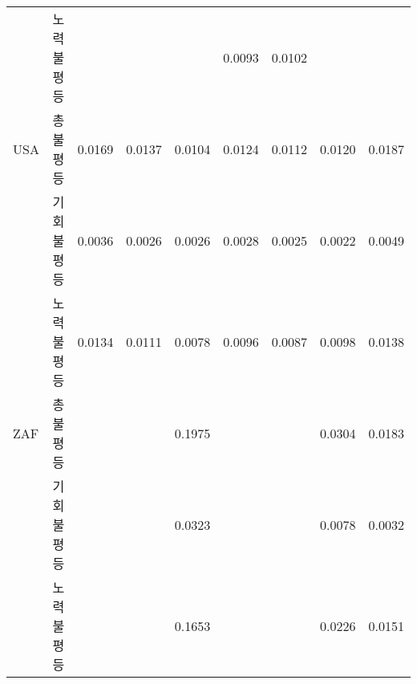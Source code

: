 \begin{longtable}{cc|rrrrrrr}
          & 노력불평등 &       &       &       & 0.0093 & 0.0102 &       & \\
    \multicolumn{1}{l}{USA} & 총불평등  & 0.0169 & 0.0137 & 0.0104 & 0.0124 & 0.0112 & 0.0120 & 0.0187 \\
          & 기회불평등 & 0.0036 & 0.0026 & 0.0026 & 0.0028 & 0.0025 & 0.0022 & 0.0049 \\
          & 노력불평등 & 0.0134 & 0.0111 & 0.0078 & 0.0096 & 0.0087 & 0.0098 & 0.0138 \\
    \multicolumn{1}{l}{ZAF} & 총불평등  &       &       & 0.1975 &       &       & 0.0304 & 0.0183 \\
          & 기회불평등 &       &       & 0.0323 &       &       & 0.0078 & 0.0032 \\
          & 노력불평등 &       &       & 0.1653 &       &       & 0.0226 & 0.0151 \\
\end{longtable}%